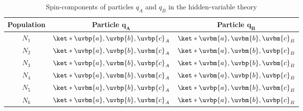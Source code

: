 \documentclass[12pt]{report}
\providecommand{\DIFadd}[1]{{\protect\color{blue}\uwave{#1}}} %
\providecommand{\DIFdel}[1]{{\protect\color{red}\sout{#1}}}                      %
\providecommand{\DIFaddFL}[1]{\DIFadd{#1}} %
\providecommand{\DIFdelFL}[1]{\DIFdel{#1}} %
\providecommand{\DIFaddbeginFL}{} %
\providecommand{\DIFaddendFL}{} %
\providecommand{\DIFdelbeginFL}{} %
\providecommand{\DIFdelendFL}{} %
\begin{document}
      \begin{table}[ht]
      \caption{Spin-components of particles $q_A$ and $q_B$ in the hidden-variable theory}
      \centering
      \begin{tabular}{c c c} 
      \\ 
      \hline
      \textbf{Population}& \textbf{Particle} $\bm{q_A}$ & \textbf{Particle} $\bm{q_B}$ \\ [0.5ex] 
      \hline
      $N_1$ & \DIFdelbeginFL \DIFdelFL{$\ket*{\uvbp{a},\uvbp{b},\uvbp{c}}_A$ }\DIFdelendFL \DIFaddbeginFL \DIFaddFL{$\ket*{\uvbp{a};\uvbp{b};\uvbp{c}}_A$ }\DIFaddendFL & \DIFdelbeginFL \DIFdelFL{$\ket*{\uvbm{a},\uvbm{b},\uvbm{c}}_B$ }\DIFdelendFL \DIFaddbeginFL \DIFaddFL{$\ket*{\uvbm{a};\uvbm{b};\uvbm{c}}_B$ }\DIFaddendFL \\ 

      $N_2$ & \DIFdelbeginFL \DIFdelFL{$\ket*{\uvbp{a},\uvbp{b},\uvbm{c}}_A$ }\DIFdelendFL \DIFaddbeginFL \DIFaddFL{$\ket*{\uvbp{a};\uvbp{b};\uvbm{c}}_A$ }\DIFaddendFL & \DIFdelbeginFL \DIFdelFL{$\ket*{\uvbm{a},\uvbm{b},\uvbp{c}}_B $}\DIFdelendFL \DIFaddbeginFL \DIFaddFL{$\ket*{\uvbm{a};\uvbm{b};\uvbp{c}}_B $}\DIFaddendFL \\ 

      $N_3$ & \DIFdelbeginFL \DIFdelFL{$\ket*{\uvbp{a},\uvbm{b},\uvbp{c}}_A$ }\DIFdelendFL \DIFaddbeginFL \DIFaddFL{$\ket*{\uvbp{a};\uvbm{b};\uvbp{c}}_A$ }\DIFaddendFL & \DIFdelbeginFL \DIFdelFL{$\ket*{\uvbm{a},\uvbp{b},\uvbm{c}}_B$ }\DIFdelendFL \DIFaddbeginFL \DIFaddFL{$\ket*{\uvbm{a};\uvbp{b};\uvbm{c}}_B$ }\DIFaddendFL \\ 

      $N_4$ & \DIFdelbeginFL \DIFdelFL{$\ket*{\uvbp{a},\uvbm{b},\uvbm{c}}_A$ }\DIFdelendFL \DIFaddbeginFL \DIFaddFL{$\ket*{\uvbp{a};\uvbm{b};\uvbm{c}}_A$ }\DIFaddendFL & \DIFdelbeginFL \DIFdelFL{$\ket*{\uvbm{a},\uvbp{b},\uvbp{c}}_B $}\DIFdelendFL \DIFaddbeginFL \DIFaddFL{$\ket*{\uvbm{a};\uvbp{b};\uvbp{c}}_B $}\DIFaddendFL \\ 

      $N_5$ & \DIFdelbeginFL \DIFdelFL{$\ket*{\uvbm{a},\uvbp{b},\uvbp{c}}_A$ }\DIFdelendFL \DIFaddbeginFL \DIFaddFL{$\ket*{\uvbm{a};\uvbp{b};\uvbp{c}}_A$ }\DIFaddendFL & \DIFdelbeginFL \DIFdelFL{$\ket*{\uvbp{a},\uvbm{b},\uvbm{c}}_B$ }\DIFdelendFL \DIFaddbeginFL \DIFaddFL{$\ket*{\uvbp{a};\uvbm{b};\uvbm{c}}_B$ }\DIFaddendFL \\ 

      $N_6$ & \DIFdelbeginFL \DIFdelFL{$\ket*{\uvbm{a},\uvbp{b},\uvbm{c}}_A$ }\DIFdelendFL \DIFaddbeginFL \DIFaddFL{$\ket*{\uvbm{a};\uvbp{b};\uvbm{c}}_A$ }\DIFaddendFL & \DIFdelbeginFL \DIFdelFL{$\ket*{\uvbp{a},\uvbm{b},\uvbp{c}}_B$ }\DIFdelendFL \DIFaddbeginFL \DIFaddFL{$\ket*{\uvbp{a};\uvbm{b};\uvbp{c}}_B$ }\DIFaddendFL \\ 


\end{tabular}
\end{table}
\end{document}
